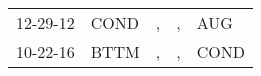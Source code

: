 \begin{supertabular}{lllll}
 12-29-12 &  COND &  , &  , &   AUG \\
 10-22-16 &  BTTM &  , &  , &  COND \\
\end{supertabular}
